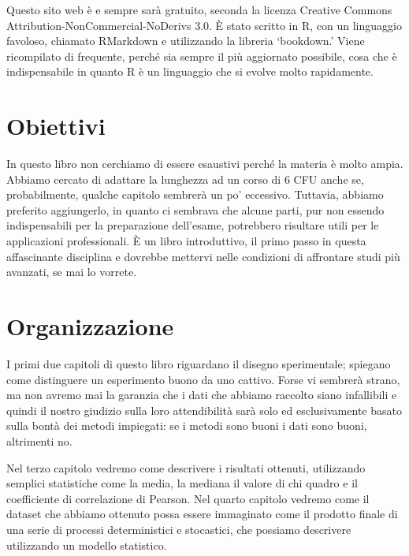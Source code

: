 \documentclass[a4paper,12pt,oneside]{book}
\begin{document}
Questo sito web è e sempre sarà gratuito, seconda la licenza Creative Commons Attribution-NonCommercial-NoDerivs 3.0. È stato scritto in R, con un linguaggio favoloso, chiamato RMarkdown e utilizzando la libreria `bookdown.' Viene ricompilato di frequente, perché sia sempre il più aggiornato possibile, cosa che è indispensabile in quanto R è un linguaggio che si evolve molto rapidamente.

\hypertarget{obiettivi}{%
\section*{Obiettivi}\label{obiettivi}}

In questo libro non cerchiamo di essere esaustivi perché la materia è molto ampia. Abbiamo cercato di adattare la lunghezza ad un corso di 6 CFU anche se, probabilmente, qualche capitolo sembrerà un po' eccessivo. Tuttavia, abbiamo preferito aggiungerlo, in quanto ci sembrava che alcune parti, pur non essendo indispensabili per la preparazione dell'esame, potrebbero risultare utili per le applicazioni professionali. È un libro introduttivo, il primo passo in questa affascinante disciplina e dovrebbe mettervi nelle condizioni di affrontare studi più avanzati, se mai lo vorrete.

\hypertarget{organizzazione}{%
\section*{Organizzazione}\label{organizzazione}}

I primi due capitoli di questo libro riguardano il disegno sperimentale; spiegano come distinguere un esperimento buono da uno cattivo. Forse vi sembrerà strano, ma non avremo mai la garanzia che i dati che abbiamo raccolto siano infallibili e quindi il nostro giudizio sulla loro attendibilità sarà solo ed esclusivamente basato sulla bontà dei metodi impiegati: se i metodi sono buoni i dati sono buoni, altrimenti no.

Nel terzo capitolo vedremo come descrivere i risultati ottenuti, utilizzando semplici statistiche come la media, la mediana il valore di chi quadro e il coefficiente di correlazione di Pearson. Nel quarto capitolo vedremo come il dataset che abbiamo ottenuto possa essere immaginato come il prodotto finale di una serie di processi deterministici e stocastici, che possiamo descrivere utilizzando un modello statistico.
\end{document}
